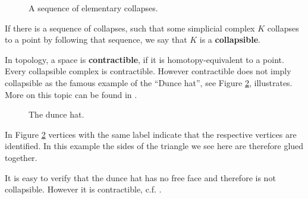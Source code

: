 \begin{figure}[H]
\begin{subfigure}[c]{0.45\textwidth}
\begin{center}

\end{center}
\end{subfigure}
\begin{subfigure}[c]{0.45\textwidth}
\begin{center}

\end{center}
\end{subfigure}
\begin{subfigure}[c]{0.45\textwidth}
\begin{center}

\end{center}
\end{subfigure}
\begin{subfigure}[c]{0.45\textwidth}
\begin{center}

\end{center}
\end{subfigure}
\caption{A sequence of elementary collapses.}
\label{fig:collapses}
\end{figure}

If there is a sequence of collapses, such that some simplicial complex $K$ collapses to a point by following that sequence, we say that $K$ is a \textbf{collapsible}.

In topology, a space is \textbf{contractible}, if it is homotopy-equivalent to a point. Every collapsible complex is contractible. However contractible does not imply collapsible as the famous example of the \enquote{Dunce hat}, see Figure \ref{fig:dunce}, illustrates. 
More on this topic can be found in \cite{cohenhom}.

\begin{figure}[H]
\begin{subfigure}[c]{0.95\textwidth}
\begin{center}

\end{center}
\end{subfigure}
\caption{The dunce hat.}
\label{fig:dunce}
\end{figure}

In Figure \ref{fig:dunce} vertices with the same label indicate that the respective vertices are identified. In this example the sides of the triangle we see here are therefore glued together.

It is easy to verify that the dunce hat has no free face and therefore is not collapsible. However it is contractible, c.f. \cite{ZEEMAN1963341}.